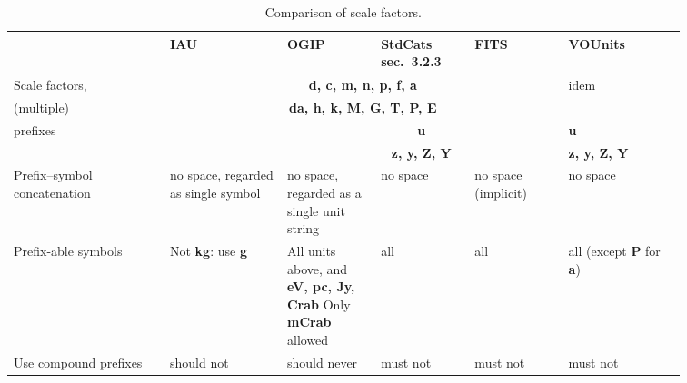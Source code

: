\documentclass[11pt,notitlepage,onecolumn]{ivoa}
\newcommand{\unit}[1]{\textbf{\textsf{\color{orange}#1}}}
\def\micro{{\ensuremath \mu}}
\begin{document}

\begin{table}[ht]
\begin{tabular}{|p{0.2\linewidth}|p{0.15\linewidth}|p{0.12\linewidth}|p{0.12\linewidth}|p{0.12\linewidth}|p{0.15\linewidth}|}
\hline
    & IAU & OGIP & StdCats sec.~3.2.3 & FITS & VOUnits\\\hline
    Scale factors,   & \multicolumn{4}{c|}{\unit{d, c, m, n, p, f, a}} & idem \\
    (multiple) & \multicolumn{4}{c|}{\unit{da, h, k, M, G, T, P, E}}  & \\
    prefixes & \unit{\micro} & \multicolumn{3}{c|}{\unit{u}} & \unit{u}\\
     &  & \multicolumn{3}{c|}{\unit{z, y, Z, Y}} & \unit{z, y, Z, Y}\\\hline
    Prefix--symbol concatenation & no space, regarded as single symbol\raggedright & no space, regarded as a single unit string\raggedright & no space & no space (implicit)\raggedright & no space\\\hline
    Prefix-able symbols  & Not \unit{kg}: use \unit{g}\raggedright & All units above, and \unit{eV, pc, Jy, Crab} Only \unit{mCrab} allowed\raggedright & all & all & all (except \unit{P} for \unit{a})\\\hline
    Use compound prefixes & should not & should never & must not & must not & must not\\\hline
\end{tabular}
  \caption{Comparison of scale factors.}
  \label{tabx:comparUnitScale}
\end{table}



\end{document}
